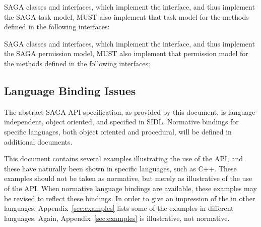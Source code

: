    \begin{shortlist}

    \item SAGA classes and interfaces, which implement the
     interface, and thus implement the SAGA task
    model, MUST also implement that task model for the methods
    defined in the following interfaces:
    
    \begin{shortlist}
    
     \item {}
     \item {}
     \item {}
     \item {}

    \end{shortlist}


    \item SAGA classes and interfaces, which implement the
     interface, and thus implement the SAGA
    permission model, MUST also implement that permission model for
    the methods defined in the following interfaces:
    
    \begin{shortlist}
    
     \item {}
     \item {}
     \item {}

    \end{shortlist}


  \end{shortlist}





  \subsection{Language Binding Issues}

   The abstract SAGA API specification, as provided by this
   document, is language independent, object oriented, and
   specified in SIDL. Normative bindings for specific languages,
   both object oriented and procedural, will be defined in
   additional documents.

   This document contains several examples illustrating the use
   of the API, and these have naturally been shown in specific
   languages, such as C++. These examples should not be taken as
   normative, but merely as illustrative of the use of the API.
   When normative language bindings are available, these
   examples may be revised to reflect these bindings.  In order
   to give an impression of the \LF in other languages,
   Appendix~\ref{sec:examples} lists some of the examples in
   different languages. Again, Appendix~\ref{sec:examples} is
   illustrative, not normative.
   
